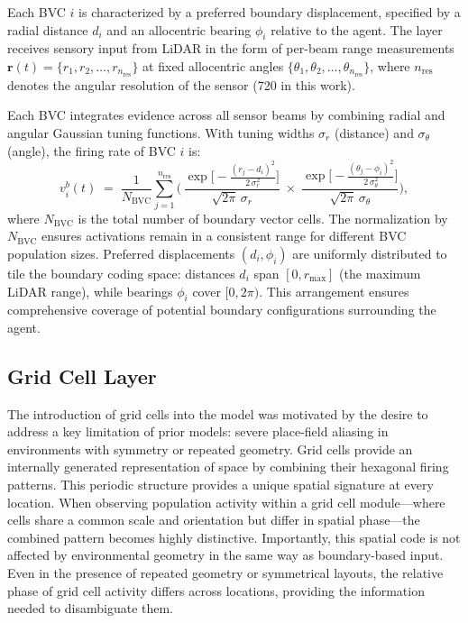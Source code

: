 \documentclass[conference]{IEEEtran}
\begin{document}
Each BVC $i$ is characterized by a preferred boundary displacement, specified by a radial distance $d_i$ and an allocentric bearing $\phi_i$ relative to the agent. The layer receives sensory input from LiDAR in the form of per-beam range measurements
$\mathbf{r}(t) = \{r_1, r_2, \ldots, r_{n_{\text{res}}}\}$ 
at fixed allocentric angles 
$\{\theta_1, \theta_2, \ldots, \theta_{n_{\text{res}}}\}$,
where $n_{\text{res}}$ denotes the angular resolution of the sensor (720 in this work).

Each BVC integrates evidence across all sensor beams by combining radial and angular Gaussian tuning functions. With tuning widths $\sigma_r$ (distance) and $\sigma_\theta$ (angle), the firing rate of BVC $i$ is:
\begin{equation}
    v_i^b(t) 
    \;=\; \frac{1}{N_{\text{BVC}}} \sum_{j=1}^{n_{\mathrm{res}}}
    \Biggl(\,
        \frac{\exp\!\bigl[-\tfrac{(r_j - d_i)^2}{2\,\sigma_r^2}\bigr]}{\sqrt{2\pi}\,\sigma_r}
        \;\times\;
        \frac{\exp\!\bigl[-\tfrac{(\theta_j - \phi_i)^2}{2\,\sigma_\theta^2}\bigr]}{\sqrt{2\pi}\,\sigma_\theta}
    \Biggr),
\label{eq:bvc}
\end{equation}
where $N_{\text{BVC}}$ is the total number of boundary vector cells. The normalization by $N_{\text{BVC}}$ ensures activations remain in a consistent range for different BVC population sizes. Preferred displacements $(d_i, \phi_i)$ are uniformly distributed to tile the boundary coding space: distances $d_i$ span $[0, r_{\max}]$ (the maximum LiDAR range), while bearings $\phi_i$ cover $[0, 2\pi)$. This arrangement ensures comprehensive coverage of potential boundary configurations surrounding the agent.

\subsection{Grid Cell Layer}
\label{sec:gc}

The introduction of grid cells into the model was motivated by the desire to address a key limitation of prior models: severe place-field aliasing in environments with symmetry or repeated geometry. Grid cells provide an internally generated representation of space by combining their hexagonal firing patterns.  This periodic structure provides a unique spatial signature at every location. When observing population activity within a grid cell module—where cells share a common scale and orientation but differ in spatial phase—the combined pattern becomes highly distinctive. Importantly, this spatial code is not affected by environmental geometry in the same way as boundary-based input. Even in the presence of repeated geometry or symmetrical layouts, the relative phase of grid cell activity differs across locations, providing the information needed to disambiguate them. 
\end{document}
